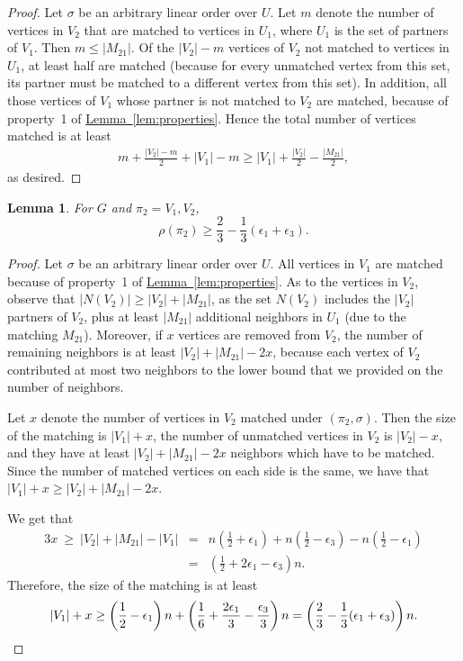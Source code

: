 \documentclass[11pt]{article}
\numberwithin{equation}{section}
\newtheorem{lemma}[theorem]{Lemma}
\theoremstyle{definition}
\theoremstyle{plain}
\newcommand{\expref}[2]{\hyperref[#2]{#1~\ref{#2}}}
\theoremstyle{plain}
\begin{document}
\begin{proof}
	Let $\sigma$ be an arbitrary linear order over $U$. Let $m$ denote the number of vertices in $V_2$ that are matched to vertices in $U_1$, where $U_1$ is the set of partners of $V_1$.
	Then $m \le |M_{21}|$. Of the $|V_2| - m$ vertices of $V_2$ not matched to vertices in $U_1$, at least half are matched (because for every unmatched vertex from this set, its partner must be matched to a different vertex from this set). In addition, all those vertices of $V_1$ whose partner is not matched to $V_2$ are matched, because of property~1 of \expref{Lemma}{lem:properties}. Hence the total number of vertices matched is at least 
	\begin{eqnarray}
m + \frac{|V_2| - m}{2} + |V_1| - m \ge |V_1|+\frac{|V_2|}{2} - \frac{|M_{21}|}{2},
	\end{eqnarray}
	as desired.
\end{proof}

\begin{lemma}
	\label{lem:largeM21}
	For $G$ and $\pi_2 = V_1,V_2$,
$$\rho(\pi_2) \ge \frac{2}{3} - \frac{1}{3}(\epsilon_1 + \epsilon_3).$$
\end{lemma}

\begin{proof}
	Let $\sigma$ be an arbitrary linear order over $U$. All vertices in $V_1$ are matched because of property~1 of \expref{Lemma}{lem:properties}. As to the vertices in $V_2$, observe that $|N(V_2)| \ge |V_2| + |M_{21}|$, as the set $N(V_2)$ includes the $|V_2|$ partners of $V_2$, plus at least $|M_{21}|$ additional neighbors in $U_1$ (due to the matching $M_{21}$). Moreover, if $x$ vertices are removed from $V_2$, the number of remaining neighbors is at least $|V_2| + |M_{21}| - 2x$, because each vertex of $V_2$ contributed at most two neighbors to the lower bound that we provided on the number of neighbors.
	
	Let $x$ denote the number of vertices in $V_2$ matched under $(\pi_2,\sigma)$.
	Then the size of the matching is $|V_1| + x$, the number of unmatched vertices in $V_2$ is $|V_2|-x$, and they have at least $|V_2| + |M_{21}| - 2x$ neighbors which have to be matched. Since the number of matched vertices on each side is the same, %
	we have that $|V_1| + x \ge |V_2| + |M_{21}| - 2x$.
	
	
	We get that
	\begin{eqnarray}
		3x \  \geq \  |V_2|+|M_{21}|-|V_1|
		& = & n\left(\frac{1}{2}+\epsilon_1\right)+n\left(\frac{1}{2}-\epsilon_3\right)-n\left(\frac{1}{2}-\epsilon_1\right)\\
		& = & \left(\frac{1}{2} + 2\epsilon_1 - \epsilon_3\right)n.
	\end{eqnarray}
	Therefore, the size of the matching is at least
	\begin{eqnarray}
	|V_1| + x \geq \left( \frac{1}{2} - \epsilon_1\right)n + \left(\frac{1}{6} + \frac{2\epsilon_1}{3} - \frac{\epsilon_3}{3}\right)n = \left(\frac{2}{3} - \frac{1}{3}(\epsilon_1 + \epsilon_3)\right) n.    \qedhere
	\end{eqnarray}
\end{proof}
\end{document}
